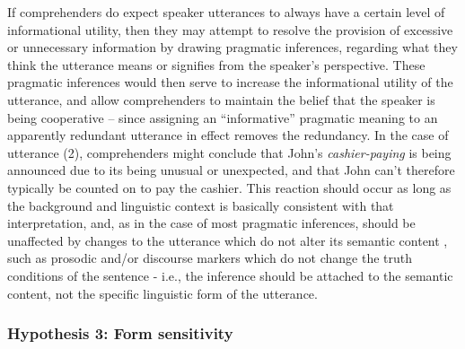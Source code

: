 If comprehenders do expect speaker utterances to always have a certain
level of informational utility, then they may attempt to resolve the
provision of excessive or unnecessary information by drawing pragmatic
inferences, regarding what they think the utterance means or signifies
from the speaker's perspective. These pragmatic inferences would then
serve to increase the informational utility of the utterance, and allow
comprehenders to maintain the belief that the speaker is being
cooperative -- since assigning an \enquote{informative} pragmatic
meaning to an apparently redundant utterance in effect removes the
redundancy. In the case of utterance (2), comprehenders might conclude
that John's \emph{cashier-paying} is being announced due to its being
unusual or unexpected, and that John can't therefore typically be
counted on to pay the cashier. This reaction should occur as long as the
background and linguistic context is basically consistent with that
interpretation, and, as in the case of most pragmatic inferences, should
be unaffected by changes to the utterance which do not alter its
semantic content \citep[generally referred to as \emph{non-detachability};][]{Grice1975}, such as prosodic and/or discourse markers which do not
change the truth conditions of the sentence - i.e., the inference should
be attached to the semantic content, not the specific linguistic form of
the utterance.

\subsubsection{Hypothesis 3: Form
sensitivity}\label{hypothesis-3-form-sensitivity}


